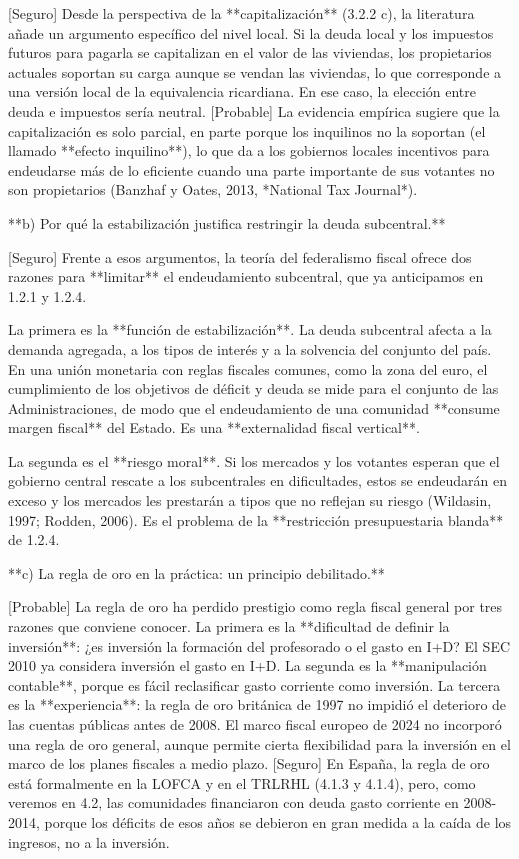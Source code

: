 \documentclass[10pt,a4paper]{article}
\begin{document}
[Seguro] Desde la perspectiva de la **capitalización** (3.2.2 c), la literatura añade un argumento específico del nivel local. Si la deuda local y los impuestos futuros para pagarla se capitalizan en el valor de las viviendas, los propietarios actuales soportan su carga aunque se vendan las viviendas, lo que corresponde a una versión local de la equivalencia ricardiana. En ese caso, la elección entre deuda e impuestos sería neutral. [Probable] La evidencia empírica sugiere que la capitalización es solo parcial, en parte porque los inquilinos no la soportan (el llamado **efecto inquilino**), lo que da a los gobiernos locales incentivos para endeudarse más de lo eficiente cuando una parte importante de sus votantes no son propietarios (Banzhaf y Oates, 2013, *National Tax Journal*).

**b) Por qué la estabilización justifica restringir la deuda subcentral.**

[Seguro] Frente a esos argumentos, la teoría del federalismo fiscal ofrece dos razones para **limitar** el endeudamiento subcentral, que ya anticipamos en 1.2.1 y 1.2.4.

La primera es la **función de estabilización**. La deuda subcentral afecta a la demanda agregada, a los tipos de interés y a la solvencia del conjunto del país. En una unión monetaria con reglas fiscales comunes, como la zona del euro, el cumplimiento de los objetivos de déficit y deuda se mide para el conjunto de las Administraciones, de modo que el endeudamiento de una comunidad **consume margen fiscal** del Estado. Es una **externalidad fiscal vertical**.

La segunda es el **riesgo moral**. Si los mercados y los votantes esperan que el gobierno central rescate a los subcentrales en dificultades, estos se endeudarán en exceso y los mercados les prestarán a tipos que no reflejan su riesgo (Wildasin, 1997; Rodden, 2006). Es el problema de la **restricción presupuestaria blanda** de 1.2.4.

**c) La regla de oro en la práctica: un principio debilitado.**

[Probable] La regla de oro ha perdido prestigio como regla fiscal general por tres razones que conviene conocer. La primera es la **dificultad de definir la inversión**: ¿es inversión la formación del profesorado o el gasto en I+D? El SEC 2010 ya considera inversión el gasto en I+D. La segunda es la **manipulación contable**, porque es fácil reclasificar gasto corriente como inversión. La tercera es la **experiencia**: la regla de oro británica de 1997 no impidió el deterioro de las cuentas públicas antes de 2008. El marco fiscal europeo de 2024 no incorporó una regla de oro general, aunque permite cierta flexibilidad para la inversión en el marco de los planes fiscales a medio plazo. [Seguro] En España, la regla de oro está formalmente en la LOFCA y en el TRLRHL (4.1.3 y 4.1.4), pero, como veremos en 4.2, las comunidades financiaron con deuda gasto corriente en 2008-2014, porque los déficits de esos años se debieron en gran medida a la caída de los ingresos, no a la inversión.
\end{document}
